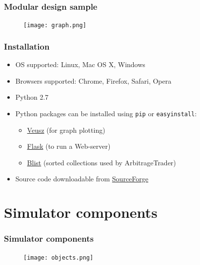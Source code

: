 \documentclass{beamer}
\begin{document}
\begin{frame}
\frametitle{Modular design sample}
\begin{figure}[htbp]
\centering
\texttt{[image: graph.png]}
\end{figure}
\end{frame}

\begin{frame}
\frametitle{Installation}
\begin{itemize}
\item OS supported: Linux, Mac OS X, Windows
\item Browsers supported: Chrome, Firefox, Safari, Opera
\item Python 2.7
\item Python packages can be installed using \texttt{pip} or \texttt{easyinstall}:
\begin{itemize}
\item \textcolor[rgb]{0.00,0.50,0.75}{\href{http://home.gna.org/veusz/}{Veusz}} (for graph plotting)
\item \textcolor[rgb]{0.00,0.50,0.75}{\href{http://flask.pocoo.org}{Flask}} (to run a Web-server)
\item \textcolor[rgb]{0.00,0.50,0.75}{\href{https://pypi.python.org/pypi/blist/}{Blist}} (sorted collections used by ArbitrageTrader)
\end{itemize}
\item Source code downloadable from \textcolor[rgb]{0.00,0.50,0.75}{\href{http://sourceforge.net/p/marketsimulator/svn/HEAD/tree/DevAnton/v3/}{SourceForge}}
\end{itemize}

\end{frame}

\section{Simulator components}

\begin{frame}
\frametitle{Simulator components}
\begin{figure}[htbp]
\centering
\texttt{[image: objects.png]}
\end{figure}
\end{frame}
\end{document}
